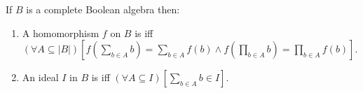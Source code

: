 If $B$ is a complete Boolean algebra then:
\begin{enumerate}
\item A homomorphism $f$ on $B$ is  iff $(\forall A \subseteq |B|) \left[ f\left(\sum_{b \in A} b\right) = \sum_{b \in A} f(b) \land f\left(\prod_{b \in A} b\right) = \prod_{b \in A} f(b) \right]$.
\item An ideal $I$ in $B$ is  iff $(\forall A \subseteq I) \left[ \sum_{b \in A} b \in I \right]$.
\end{enumerate}
